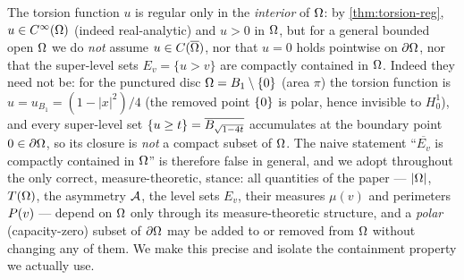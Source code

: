 The torsion function $u$ is regular only in the \emph{interior} of $\Omega$: by
\cref{thm:torsion-reg}, $u\in C^\infty(\Omega)$ (indeed real-analytic) and
$u>0$ in $\Omega$, but for a general bounded open $\Omega$ we do \emph{not} assume
$u\in C(\overline{\Omega})$, nor that $u=0$ holds pointwise on $\partial\Omega$, nor
that the super-level sets $E_v=\{u>v\}$ are compactly contained in $\Omega$.
Indeed they need not be: for the punctured disc $\Omega=B_1\setminus\left\{0\right\}$
(area $\pi$) the torsion function is $u=u_{B_1}=(1-|x|^2)/4$ (the removed
point $\left\{0\right\}$ is polar, hence invisible to $H^1_0$), and every super-level
set $\left\{u\ge t\right\}=\overline{B_{\sqrt{1-4t}}}$ accumulates at the boundary
point $0\in\partial\Omega$, so its closure is \emph{not} a compact subset of
$\Omega$. The naive statement ``$\overline{E_v}$ is compactly contained in
$\Omega$'' is therefore false in general, and we adopt throughout the only
correct, measure-theoretic, stance: all quantities of the paper ---
$|\Omega|$, $T(\Omega)$, the asymmetry $\mathcal{A}$, the level sets $E_v$, their
measures $\mu(v)$ and perimeters $P(v)$ --- depend on $\Omega$ only through
its measure-theoretic structure, and a \emph{polar} (capacity-zero) subset
of $\partial\Omega$ may be added to or removed from $\Omega$ without changing any
of them. We make this precise and isolate the containment property we
actually use.

